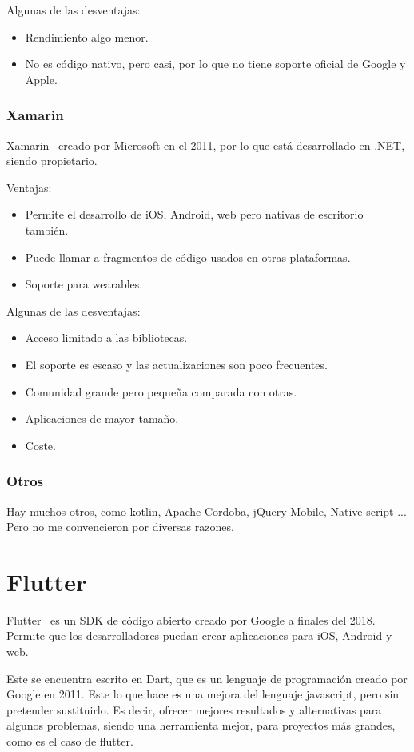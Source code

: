Algunas de las desventajas:
\begin{itemize}
	\item Rendimiento algo menor.
	\item No es código nativo, pero casi, por lo que no tiene soporte oficial de Google y Apple.
\end{itemize}

\subsubsection{Xamarin}
Xamarin~\cite{wiki:xamarin} creado por Microsoft en el 2011, por lo que está desarrollado en .NET, siendo propietario.

Ventajas:
\begin{itemize}
	\item Permite el desarrollo de iOS, Android, web pero nativas de escritorio también.
	\item Puede llamar a fragmentos de código usados en otras plataformas.
	\item Soporte para wearables.
\end{itemize}

Algunas de las desventajas:
\begin{itemize}
	\item Acceso limitado a las bibliotecas.
	\item El soporte es escaso y las actualizaciones son poco frecuentes.
	\item Comunidad grande pero pequeña comparada con otras.
	\item Aplicaciones de mayor tamaño.
	\item Coste.
\end{itemize}

\subsubsection{Otros}
Hay muchos otros, como kotlin, Apache Cordoba, jQuery Mobile, Native script ...
Pero no me convencieron por diversas razones.
 
\section{Flutter}
Flutter~\cite{wiki:flutter} es un SDK de código abierto creado por Google a finales del 2018. Permite que los desarrolladores puedan crear aplicaciones para iOS, Android y web.

Este se encuentra escrito en Dart, que es un lenguaje de programación creado por Google en 2011. Este lo que hace es una mejora del lenguaje javascript, pero sin pretender sustituirlo. Es decir, ofrecer mejores resultados y alternativas para algunos problemas, siendo una herramienta mejor, para proyectos más grandes, como es el caso de flutter.

